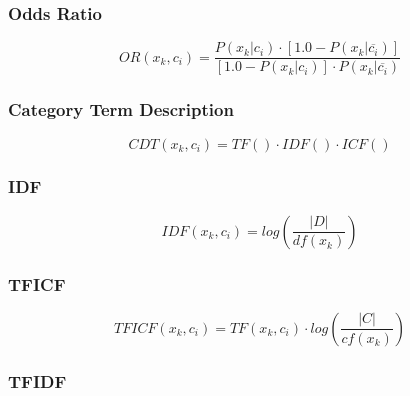 \subsubsection{Odds Ratio}
\label{subsubsection::or}

\cite{Zheng03}
\begin{equation}\label{eqn::or}
   OR(x_k, c_i) = \frac{ P(x_k|c_i) \cdot [ 1.0 - P(x_k|\overline{c_i}) ] }{ [ 1.0 - P(x_k|c_i) ] \cdot P(x_k|\overline{c_i})}
\end{equation}

\subsubsection{Category Term Description}
\label{subsubsection::ctd}
\cite{ChihHow04}
\begin{equation}\label{eqn::cdt}
   CDT(x_k, c_i) = TF() \cdot IDF() \cdot ICF()
\end{equation}


\subsubsection{IDF}
\label{subsubsection::idf}

\cite{ChihHow04}
\begin{equation}\label{eqn::tficf}
   IDF(x_k, c_i) = log( \frac{|D|} {df(x_k)} )
\end{equation}


\subsubsection{TFICF}
\label{subsubsection::tfidf}
\cite{ChihHow04}
\begin{equation}\label{eqn::tficf}
   TFICF(x_k, c_i) = TF(x_k, c_i) \cdot log( \frac{|C|} {cf(x_k)} )
\end{equation}


\subsubsection{TFIDF}
\label{subsubsection::tfidf}

